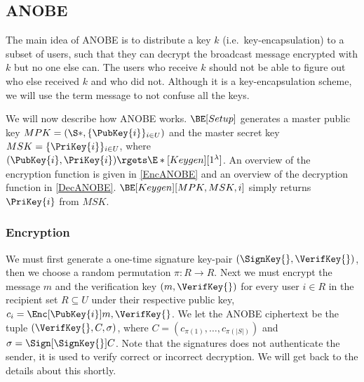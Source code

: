 \subsection{\Acl{ANOBE}}\label{ANOBE}

The main idea of \ac{ANOBE} is to distribute a key \(k\) (i.e.\ 
key-encapsulation) to a subset of users, such that they can decrypt the 
broadcast message encrypted with \(k\) but no one else can.
The users who receive \(k\) should not be able to figure out who else received 
\(k\) and who did not.
Although it is a key-encapsulation scheme, we will use the term message to not 
confuse all the keys.

We will now describe how \ac{ANOBE} works.
\(\BE[Setup]\) generates a master public key \(MPK = (\S*, \{\PubKey{i}\}_{i\in
    U})\) and the master secret key \(MSK = \{\PriKey{i}\}_{i\in U}\), where 
\((\PubKey{i}, \PriKey{i})\rgets \E*[Keygen][1^\lambda]\).
An overview of the encryption function is given in \cref{EncANOBE} and an 
overview of the decryption function in \cref{DecANOBE}.
\(\BE[Keygen][MPK, MSK, i]\) simply returns \(\PriKey{i}\) from \(MSK\).

\subsubsection{Encryption}

We must first generate a one-time signature key-pair \((\SignKey{}, 
  \VerifKey{})\), then we choose a random permutation \(\pi\colon R\to R\).
Next we must encrypt the message \(m\) and the verification key \((m, 
  \VerifKey{})\) for every user \(i\in R\) in the recipient set \(R\subseteq 
  U\) under their respective public key, \(c_{i} = \Enc[\PubKey{i}]{m, 
    \VerifKey{}}\).
We let the \ac{ANOBE} ciphertext be the tuple \((\VerifKey{}, C, \sigma)\), 
where
\(C = ( c_{\pi(1)}, \ldots, c_{\pi({|S|})})\) and
\(\sigma = \Sign[\SignKey{}]{ C }\).
Note that the signatures does not authenticate the sender, it is used to verify 
correct or incorrect decryption.
We will get back to the details about this shortly.


